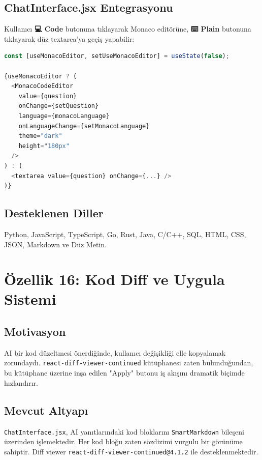 \documentclass[12pt,a4paper]{article}
\begin{document}
\subsection{ChatInterface.jsx Entegrasyonu}
Kullanıcı \textbf{💻 Code} butonuna tıklayarak Monaco editörüne, \textbf{⌨️ Plain} butonuna tıklayarak düz textarea'ya geçiş yapabilir:

\begin{lstlisting}[language=JavaScript, caption={Monaco/Textarea toggle}]
const [useMonacoEditor, setUseMonacoEditor] = useState(false);

{useMonacoEditor ? (
  <MonacoCodeEditor
    value={question}
    onChange={setQuestion}
    language={monacoLanguage}
    onLanguageChange={setMonacoLanguage}
    theme="dark"
    height="180px"
  />
) : (
  <textarea value={question} onChange={...} />
)}
\end{lstlisting}

\subsection{Desteklenen Diller}
Python, JavaScript, TypeScript, Go, Rust, Java, C/C++, SQL, HTML, CSS, JSON, Markdown ve Düz Metin.

\newpage

\section{Özellik 16: Kod Diff ve Uygula Sistemi}

\subsection{Motivasyon}
AI bir kod düzeltmesi önerdiğinde, kullanıcı değişikliği elle kopyalamak zorundaydı. \texttt{react-diff-viewer-continued} kütüphanesi zaten bulunduğundan, bu kütüphane üzerine inşa edilen "Apply" butonu iş akışını dramatik biçimde hızlandırır.

\subsection{Mevcut Altyapı}
\texttt{ChatInterface.jsx}, AI yanıtlarındaki kod bloklarını \texttt{SmartMarkdown} bileşeni üzerinden işlemektedir. Her kod bloğu zaten sözdizimi vurgulu bir görünüme sahiptir. Diff viewer \texttt{react-diff-viewer-continued@4.1.2} ile desteklenmektedir.
\end{document}
